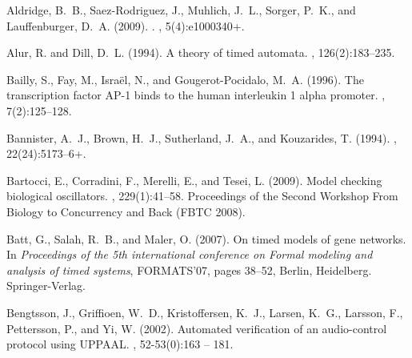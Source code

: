 \documentclass{bmcart}
\begin{document}
\begin{backmatter}
%




% 
% 

\begin{thebibliography}{}

Aldridge, B.~B., Saez-Rodriguez, J., Muhlich, J.~L., Sorger, P.~K., and
  Lauffenburger, D.~A. (2009).
.
, 5(4):e1000340+.

Alur, R. and Dill, D.~L. (1994).
\newblock A theory of timed automata.
, 126(2):183--235.

Bailly, S., Fay, M., Isra{\"{e}}l, N., and Gougerot-Pocidalo, M.~A. (1996).
\newblock The transcription factor {AP-1} binds to the human interleukin 1
  alpha promoter.
, 7(2):125--128.

Bannister, A.~J., Brown, H.~J., Sutherland, J.~A., and Kouzarides, T. (1994).
, 22(24):5173--6+.

Bartocci, E., Corradini, F., Merelli, E., and Tesei, L. (2009).
\newblock Model checking biological oscillators.
,
  229(1):41--58.
\newblock Proceedings of the Second Workshop From Biology to Concurrency and
  Back (FBTC 2008).

Batt, G., Salah, R.~B., and Maler, O. (2007).
\newblock On timed models of gene networks.
\newblock In {\em Proceedings of the 5th international conference on Formal
  modeling and analysis of timed systems}, FORMATS'07, pages 38--52, Berlin,
  Heidelberg. Springer-Verlag.

Bengtsson, J., Griffioen, W.~D., Kristoffersen, K.~J., Larsen, K.~G., Larsson,
  F., Pettersson, P., and Yi, W. (2002).
\newblock Automated verification of an audio-control protocol using {UPPAAL}.
, 52-53(0):163 --
  181.


\end{thebibliography}
\end{backmatter}
\end{document}
